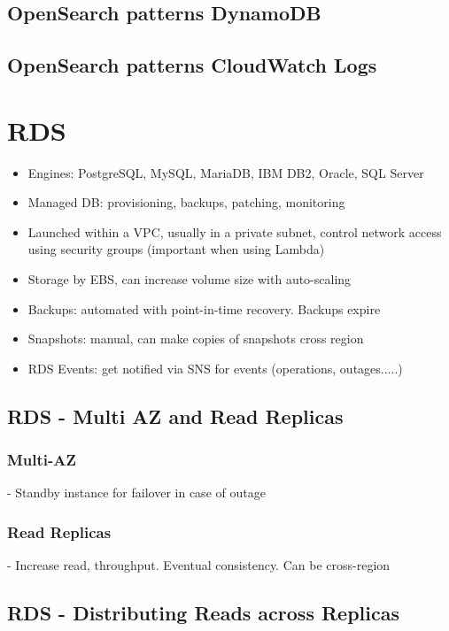 \subsection{OpenSearch patterns DynamoDB}

\subsection{OpenSearch patterns CloudWatch Logs}


\section{RDS}
\begin{itemize}
    \item Engines: PostgreSQL, MySQL, MariaDB, IBM DB2, Oracle, SQL Server
    \item Managed DB: provisioning, backups, patching, monitoring
    \item Launched within a VPC, usually in a private subnet, control network access using security groups (important when using Lambda)
    \item Storage by EBS, can increase volume size with auto-scaling
    \item Backups: automated with point-in-time recovery. Backups expire
    \item Snapshots: manual, can make copies of snapshots cross region
    \item RDS Events: get notified via SNS for events (operations, outages.....)
\end{itemize}

\subsection{RDS - Multi AZ and Read Replicas}

\subsubsection{Multi-AZ}
- Standby instance for failover in case of outage

\subsubsection{Read Replicas}
- Increase read, throughput. Eventual consistency. Can be cross-region

\subsection{RDS - Distributing Reads across Replicas}

